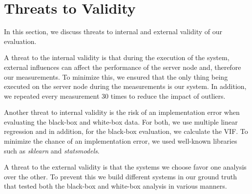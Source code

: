\section{Threats to Validity}\label{sec:threats}

In this section, we discuss threats to internal and external validity of our evaluation.

A threat to the internal validity is that during the execution of the system, 
external influences can affect the performance of the server node and, therefore our measurements. 
To minimize this, we ensured that the only thing being executed on the server node during the measurements is our system. 
In addition, we repeated every measurement $30$ times to reduce the impact of outliers.  

Another threat to internal validity is the risk of an implementation error when evaluating the black-box and white-box data.
For both, we use multiple linear regression and in addition, for the black-box evaluation, we calculate the VIF.
To minimize the chance of an implementation error, we used well-known libraries such as \emph{sklearn} and \emph{statsmodels}.

A threat to the external validity is that the systems we choose favor one analysis over the other. 
To prevent this we build different systems in our ground truth that tested both the black-box and white-box analysis 
in various manners.